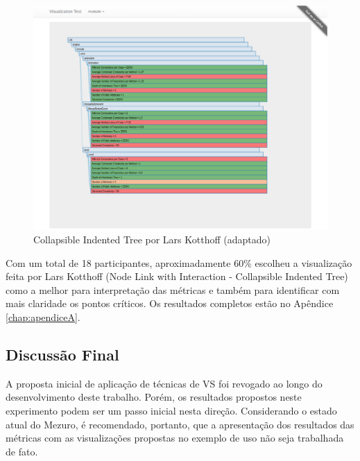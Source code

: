 \begin{figure}[!htb]
	\centering
    \includegraphics[keepaspectratio=true,scale=0.35]
    {figuras/node_link_tree_with_interaction.eps}
  \caption{Collapsible Indented Tree por Lars Kotthoff (adaptado)}
  \label{fig:node_link_tree_with_interaction}
\end{figure}

\newpage

\newpage

Com um total de 18 participantes, aproximadamente 60\% escolheu a visualização
feita por Lars Kotthoff (Node Link with Interaction - Collapsible Indented
Tree) como a melhor para interpretação das métricas e também para identificar
com mais claridade os pontos críticos. Os resultados completos estão no Apêndice
\ref{chap:apendiceA}.

\subsection{Discussão Final}

A proposta inicial de aplicação de técnicas de VS foi revogado ao longo do
desenvolvimento deste trabalho. Porém, os resultados propostos neste experimento
podem ser um passo inicial nesta direção. Considerando o estado atual do Mezuro,
é recomendado, portanto, que a apresentação dos resultados das métricas com as
visualizações propostas no exemplo de uso não seja trabalhada de fato.
